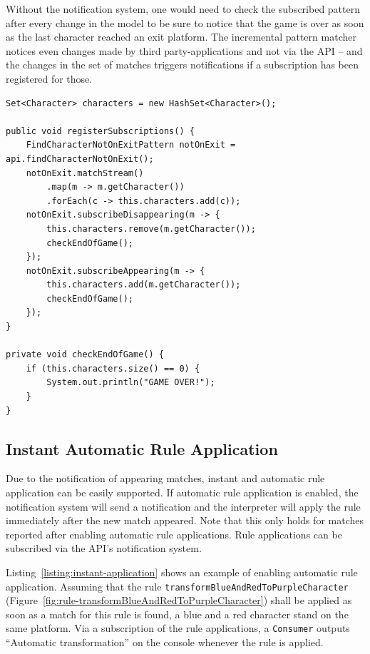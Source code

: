 Without the notification system, one would need to check the subscribed pattern after every change in the model to be sure to notice that the game is over as soon as the last character reached an exit platform.
The incremental pattern matcher notices even changes made by third party-applications and not via the API -- and the changes in the set of matches triggers notifications if a subscription has been registered for those.

\begin{lstlisting}[caption={Subscription of Notifications}, label={listing:notifications}]
Set<Character> characters = new HashSet<Character>();

public void registerSubscriptions() {
	FindCharacterNotOnExitPattern notOnExit = api.findCharacterNotOnExit();
	notOnExit.matchStream()
		.map(m -> m.getCharacter())
		.forEach(c -> this.characters.add(c));
	notOnExit.subscribeDisappearing(m -> {
		this.characters.remove(m.getCharacter());
		checkEndOfGame();
	});
	notOnExit.subscribeAppearing(m -> {
		this.characters.add(m.getCharacter());
		checkEndOfGame();
	});
}

private void checkEndOfGame() {
	if (this.characters.size() == 0) {
		System.out.println("GAME OVER!");
	}
}
\end{lstlisting}

\subsection{Instant Automatic Rule Application}
\label{instant-automatic-rule-application}
Due to the notification of appearing matches, instant and automatic rule application can be easily supported.
If automatic rule application is enabled, the notification system will send a notification and the interpreter will apply the rule immediately after the new match appeared.
Note that this only holds for matches reported after enabling automatic rule applications.
Rule applications can be subscribed via the API's notification system.

Listing~\ref{listing:instant-application} shows an example of enabling automatic rule application.
Assuming that the rule \texttt{transformBlueAndRedToPurpleCharacter} (Figure~\ref{fig:rule-transformBlueAndRedToPurpleCharacter}) shall be applied as soon as a match for this rule is found, \ie a blue and a red character stand on the same platform.
Via a subscription of the rule applications, a \texttt{Consumer} outputs ``Automatic transformation'' on the console whenever the rule is applied.

